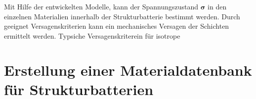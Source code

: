 Mit Hilfe der entwickelten Modelle, kann der Spannungszustand $\boldsymbol{\sigma}$ in den einzelnen Materialien innerhalb der Strukturbatterie bestimmt werden. Durch geeignet Versagenskriterien kann ein mechanisches Versagen der Schichten ermittelt werden.  
Typsiche Versagenskriterein für isotrope 




\section{\label{sec:digitalisation}Erstellung einer Materialdatenbank für Strukturbatterien}